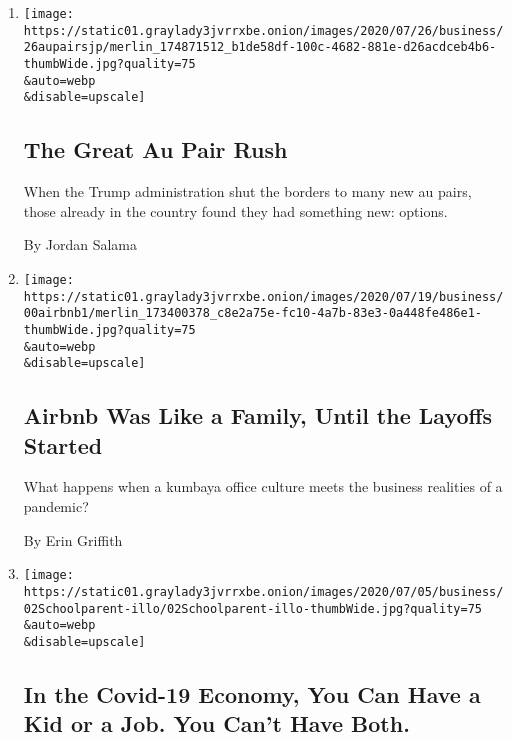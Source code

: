 \begin{enumerate}
\def\labelenumi{\arabic{enumi}.}
\item
  \href{/2020/07/25/business/the-great-au-pair-rush.html}{}

  \texttt{[image: https://static01.graylady3jvrrxbe.onion/images/2020/07/26/business/26aupairsjp/merlin\_174871512\_b1de58df-100c-4682-881e-d26acdceb4b6-thumbWide.jpg?quality=75\\\&auto=webp\\\&disable=upscale]}

  \hypertarget{the-great-au-pair-rush}{%
  \subsection{The Great Au Pair Rush}\label{the-great-au-pair-rush}}

  When the Trump administration shut the borders to many new au pairs,
  those already in the country found they had something new: options.

  By Jordan Salama
\item
  \href{/2020/07/17/technology/airbnb-coronavirus-layoffs-.html}{}

  \texttt{[image: https://static01.graylady3jvrrxbe.onion/images/2020/07/19/business/00airbnb1/merlin\_173400378\_c8e2a75e-fc10-4a7b-83e3-0a448fe486e1-thumbWide.jpg?quality=75\\\&auto=webp\\\&disable=upscale]}

  \hypertarget{airbnb-was-like-a-family-until-the-layoffs-started-1}{%
  \subsection{Airbnb Was Like a Family, Until the Layoffs
  Started}\label{airbnb-was-like-a-family-until-the-layoffs-started-1}}

  What happens when a kumbaya office culture meets the business
  realities of a pandemic?

  By Erin Griffith
\item
  \href{/2020/07/02/business/covid-economy-parents-kids-career-homeschooling.html}{}

  \texttt{[image: https://static01.graylady3jvrrxbe.onion/images/2020/07/05/business/02Schoolparent-illo/02Schoolparent-illo-thumbWide.jpg?quality=75\\\&auto=webp\\\&disable=upscale]}

  \hypertarget{in-the-covid-19-economy-you-can-have-a-kid-or-a-job-you-cant-have-both}{%
  \subsection{In the Covid-19 Economy, You Can Have a Kid or a Job. You
  Can't Have
  Both.}\label{in-the-covid-19-economy-you-can-have-a-kid-or-a-job-you-cant-have-both}}


\end{enumerate}
